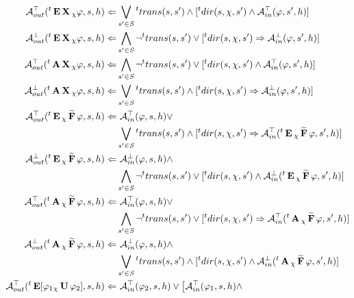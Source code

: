 \begin{align*}
	\assumeT_{out}(\withTime{t}\ctlE\dctlX{\chi} \varphi, s, h)  \Leftarrow & \bigvee_{s' \in \dtsS} \withTime{t}trans(s,s') \land [\withTime{t}dir(s, \chi, s') \land \assumeT_{in}(\varphi, s', h)] \\
	\assumeF_{out}(\withTime{t}\ctlE\dctlX{\chi} \varphi, s, h) \Leftarrow & \bigwedge_{s' \in \dtsS} \neg\withTime{t}trans(s,s') \lor [\withTime{t}dir(s, \chi, s') \Rightarrow \assumeF_{in}(\varphi, s', h)] \\
	\assumeT_{out}(\withTime{t}\ctlA\dctlX{\chi} \varphi, s, h) \Leftarrow & \bigwedge_{s' \in \dtsS} \neg \withTime{t}trans(s,s') \lor [\withTime{t}dir(s, \chi, s') \land \assumeT_{in}(\varphi, s', h)] \\
	\assumeF_{out}(\withTime{t}\ctlA\dctlX{\chi} \varphi, s, h)  \Leftarrow & \bigvee_{s' \in \dtsS} \withTime{t}trans(s,s') \land [ \withTime{t}dir(s, \chi, s') \Rightarrow \assumeF_{in}(\varphi, s', h)] \\
	\assumeT_{out}(\withTime{t}\ctlE\dctlFW{\chi} \varphi, s, h)  \Leftarrow &\ \assumeT_{in}(\varphi, s, h) \lor \\
	 & \bigvee_{s' \in \dtsS} \withTime{t}trans(s,s') \land [\withTime{t}dir(s, \chi, s') \Rightarrow \assumeT_{in}(\withTime{t}\ctlE\dctlFW{\chi} \varphi, s', h) ] \\
	 \assumeF_{out}(\withTime{t}\ctlE\dctlFW{\chi} \varphi, s, h)  \Leftarrow &\ \assumeF_{in}(\varphi, s, h) \land \\
	 & \bigwedge_{s' \in \dtsS} \neg\withTime{t}trans(s,s') \lor [\withTime{t}dir(s, \chi, s') \land \assumeF_{in}(\withTime{t}\ctlE\dctlFW{\chi} \varphi, s', h) ] \\
	 \assumeT_{out}(\withTime{t}\ctlA\dctlFW{\chi} \varphi, s, h)  \Leftarrow &\ \assumeT_{in}(\varphi, s, h) \lor \\
	 & \bigwedge_{s' \in \dtsS} \neg\withTime{t}trans(s,s') \lor [\withTime{t}dir(s, \chi, s') \Rightarrow \assumeT_{in}(\withTime{t}\ctlA\dctlFW{\chi} \varphi, s', h) ] \\
	 \assumeF_{out}(\withTime{t}\ctlA\dctlFW{\chi} \varphi, s, h)  \Leftarrow &\ \assumeF_{in}(\varphi, s, h) \land \\
	 & \bigvee_{s' \in \dtsS} \withTime{t}trans(s,s') \land [\withTime{t}dir(s, \chi, s') \land \assumeF_{in}(\withTime{t}\ctlA\dctlFW{\chi} \varphi, s', h) ] \\
	\assumeT_{out}(\withTime{t}\ctlE[ \varphi_1 \dctlUl{\chi} \varphi_2], s, h) \Leftarrow &\ \assumeT_{in}(\varphi_2, s, h) \lor \big[ \assumeT_{in}(\varphi_1, s, h) \land \\

\end{align*}
